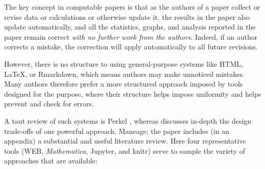 \documentclass{comjnl}
\begin{document}
The key concept in computable papers is that as the authors of a paper collect or revise data or calculations or otherwise update it, the results in the paper also update automatically, and all the statistics, graphs, and analysis reported in the paper remain correct \emph{with no further work from the authors}. Indeed, if an author corrects a mistake, the correction will apply automatically to all future revisions.

However, there is no structure to using general-purpose systems like HTML, \LaTeX, or Rmarkdown, which means authors may make unnoticed mistakes. Many authors therefore prefer a more structured approach imposed by tools designed for the purpose, where their structure helps impose uniformity and helps prevent and check for errors. 

A taut review of such systems is Perkel \cite{perkel-review}, whereas \cite{maneage} discusses in-depth the design trade-offs of one powerful approach, Maneage; the paper \cite{maneage} includes (in an appendix) a substantial and useful literature review. Here four representative tools (WEB, \emph{Mathematica}, Jupyter, and knitr) serve to sample the variety of approaches that are available:
\end{document}

